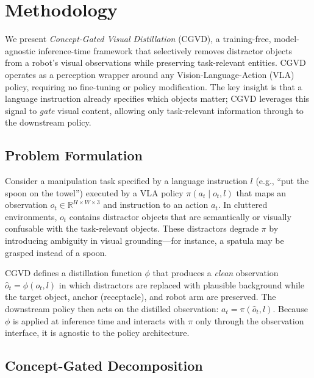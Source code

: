 \section{Methodology}
\label{sec:methodology}

We present \emph{Concept-Gated Visual Distillation} (CGVD), a training-free, model-agnostic inference-time framework that selectively removes distractor objects from a robot's visual observations while preserving task-relevant entities. CGVD operates as a perception wrapper around any Vision-Language-Action (VLA) policy, requiring no fine-tuning or policy modification. The key insight is that a language instruction already specifies which objects matter; CGVD leverages this signal to \emph{gate} visual content, allowing only task-relevant information through to the downstream policy.

\subsection{Problem Formulation}
\label{sec:problem}

Consider a manipulation task specified by a language instruction $l$ (e.g., ``put the spoon on the towel'') executed by a VLA policy $\pi(a_t \mid o_t, l)$ that maps an observation $o_t \in \mathbb{R}^{H \times W \times 3}$ and instruction to an action $a_t$. In cluttered environments, $o_t$ contains distractor objects that are semantically or visually confusable with the task-relevant objects. These distractors degrade $\pi$ by introducing ambiguity in visual grounding---for instance, a spatula may be grasped instead of a spoon.

CGVD defines a distillation function $\phi$ that produces a \emph{clean} observation $\hat{o}_t = \phi(o_t, l)$ in which distractors are replaced with plausible background while the target object, anchor (receptacle), and robot arm are preserved. The downstream policy then acts on the distilled observation: $a_t = \pi(\hat{o}_t, l)$. Because $\phi$ is applied at inference time and interacts with $\pi$ only through the observation interface, it is agnostic to the policy architecture.

\subsection{Concept-Gated Decomposition}
\label{sec:decomposition}

